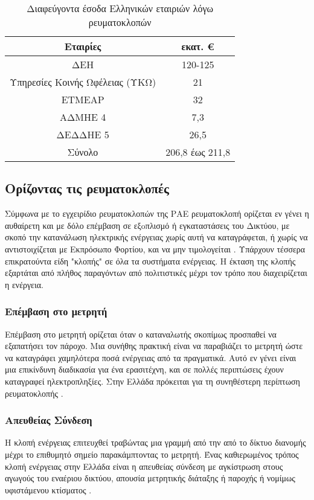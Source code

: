 \begin{table}[ht!]
\centering
\begin{tabular}{ |c||c|  }
 \hline
 Εταιρίες & εκατ. \euro\\
 \hline
 ΔΕΗ & 120-125\\
 Υπηρεσίες Κοινής Ωφέλειας (ΥΚΩ) & 21\\
 ΕΤΜΕΑΡ & 32\\
 ΑΔΜΗΕ 4 & 7,3\\
 ΔΕΔΔΗΕ 5 & 26,5\\
 \hline
 Σύνολο& 206,8 έως 211,8\\
 \hline
\end{tabular}
\caption{Διαφεύγοντα έσοδα Ελληνικών εταιριών λόγω ρευματοκλοπών}
\label{tab:lostearnings}
\end{table}
\subsection{Ορίζοντας τις ρευματοκλοπές}
Σύμφωνα με το εγχειρίδιο ρευματοκλοπών της ΡΑΕ ρευματοκλοπή ορίζεται εν γένει η αυθαίρετη και με δόλο επέμβαση σε εξoπλισμό ή εγκαταστάσεις του Δικτύου, με σκοπό την κατανάλωση ηλεκτρικής ενέργειας χωρίς αυτή να καταγράφεται, ή χωρίς να αντιστοιχίζεται με Εκπρόσωπο Φορτίου, και να μην τιμολογείται \cite{rae}. Υπάρχουν τέσσερα επικρατούντα είδη "κλοπής" σε όλα τα συστήματα ενέργειας. Η έκταση της κλοπής εξαρτάται από πλήθος παραγόντων από πολιτιστικές μέχρι τον τρόπο που διαχειρίζεται η ενέργεια. 

\subsubsection{Επέμβαση στο μετρητή}
Επέμβαση στο μετρητή ορίζεται όταν ο καταναλωτής σκοπίμως προσπαθεί να εξαπατήσει τον πάροχο. Μια συνήθης πρακτική είναι να παραβιάζει το μετρητή ώστε να καταγράφει χαμηλότερα ποσά ενέργειας από τα πραγματικά. Αυτό εν γένει είναι μια  επικίνδυνη διαδικασία για ένα ερασιτέχνη, και σε πολλές περιπτώσεις έχουν καταγραφεί ηλεκτροπληξίες. Στην Ελλάδα πρόκειται για τη συνηθέστερη περίπτωση ρευματοκλοπής \cite{rae}.
\subsubsection{Απευθείας Σύνδεση}
Η κλοπή ενέργειας επιτευχθεί τραβώντας μια γραμμή από την από το δίκτυο διανομής μέχρι το επιθυμητό σημείο παρακάμπτοντας το μετρητή. Ένας καθιερωμένος τρόπος κλοπή ενέργειας στην Ελλάδα είναι η απευθείας σύνδεση με αγκίστρωση στους αγωγούς του εναέριου δικτύου, απουσία μετρητικής διάταξης ή παροχής ή νομίμως υφιστάμενου κτίσματος \cite{rae}.
